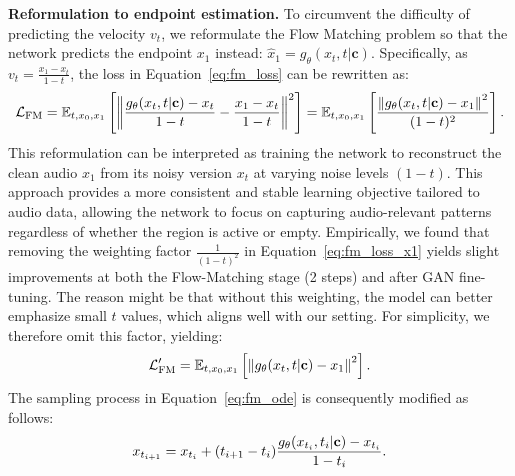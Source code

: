\documentclass{article} %
\newcommand{\yao}[1]{\textcolor[rgb]{0,0,1} {#1}}
\begin{document}
\vspace{-0.1em}
\noindent\textbf{Reformulation to endpoint estimation.} To circumvent
the difficulty of predicting the velocity $v_t$, we reformulate the Flow Matching problem so that the network predicts the endpoint $x_1$ instead: $\hat{x}_1 =g_{\theta}(x_t, t|\mathbf{c})$. 
Specifically, as $v_t = \frac{x_1 - x_t}{1 - t}$, the loss in Equation~\ref{eq:fm_loss} can be rewritten as: 
\begin{equation}
\label{eq:fm_loss_x1}
\vspace{-0.2em}
\mathcal{L}_{\mathrm{FM}}
= \mathbb{E}_{t,x_0,x_1} \left[\left\| \frac{g_{\theta}(x_t, t|\mathbf{c}) - x_t}{1 - t} - \frac{x_1 - x_t}{1 - t} \right\|^2 \right]
= \mathbb{E}_{t,x_0,x_1} \left[\frac{\left\|g_{\theta}(x_t, t|\mathbf{c}) - x_1 \right\|^2}{(1 - t)^2}\right].
\vspace{-0.1em}
\end{equation}
This reformulation can be interpreted as training the network to reconstruct the clean audio $x_1$ from its noisy version $x_t$ at varying noise levels $(1-t)$. This approach provides a more consistent and stable learning objective tailored to audio data, allowing the network to focus on capturing audio-relevant patterns regardless of whether the region is active or empty. 
Empirically, we found that removing the weighting factor $\frac{1}{(1 - t)^2}$ in Equation~\ref{eq:fm_loss_x1} yields slight improvements at both the Flow-Matching stage (2 steps) and after GAN fine-tuning. The reason might be that without this weighting, the model can better emphasize small $t$ values, which aligns well with our setting.
For simplicity, we therefore omit this factor, yielding:
\begin{equation}
\label{eq:fm_loss_x1_no_scale}
\vspace{-0.2em}
\mathcal{L}_{\mathrm{FM}}' 
= \mathbb{E}_{t,x_0,x_1} \left[\left\|g_{\theta}(x_t, t|\mathbf{c}) - x_1 \right\|^2\right].
\vspace{-0.2em}
\end{equation}
The sampling process in Equation~\ref{eq:fm_ode} is consequently modified as follows: 
\begin{equation}
\label{eq:fm_ode_x1}
\vspace{-0.3em}
x_{t_{i+1}} = x_{t_i} + (t_{i+1} - t_i)\frac{g_{\theta}(x_{t_i}, t_i|\mathbf{c}) - x_{t_i}}{1 - t_i}.
\vspace{-0.3em}
\end{equation}
\end{document}
